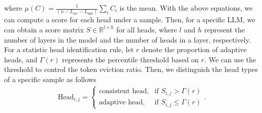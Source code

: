 where \(\mu(C) = \frac{1}{\left(n-L_{\text{rec}}-L_{\text{init}}\right)} \sum_{i} C_i\) is the mean. With the above equations, we can compute a score for each head under a sample. Then, for a specific LLM, we can obtain a score matrix \( S \in \mathbb{R}^{l \times h}\) for all heads, where \(l\) and \(h\) represent the number of layers in the model and the number of heads in a layer, respectively. For a statistic head identification rule, let $r$ denote the proportion of adaptive heads, and \( \Gamma(r) \) represents the percentile threshold based on \( r \). We can use the threshold to control the token eviction ratio. Then, we distinguish the head types of a specific sample as follows
\begin{align}\label{eq:head-classification}
\text{Head}_{i,j} = 
\begin{cases} 
\text{consistent head}, & \text{if } S_{i,j} > \Gamma(r) \\
\text{adaptive head}, & \text{if } S_{i,j} \leq \Gamma(r) 
\end{cases}.
\end{align}




